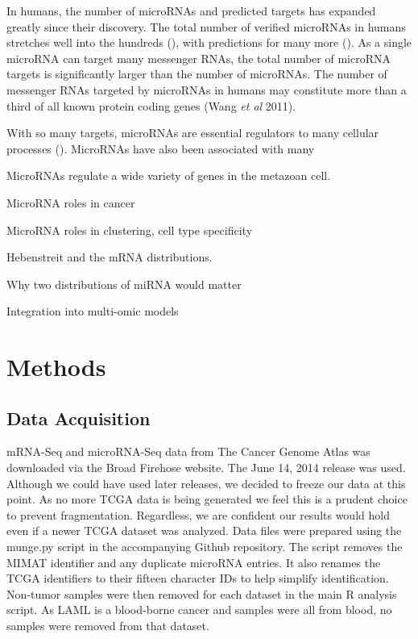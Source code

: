 \documentclass[12pt]{report}
\begin{document}
In humans, the number of microRNAs and predicted targets has expanded greatly since their discovery.
 The total number of verified microRNAs in humans  stretches well into the 
 hundreds (), with predictions for many more (). As a single microRNA can target 
 many messenger RNAs, the total number of microRNA targets is significantly 
 larger than the number of microRNAs. The number of messenger RNAs targeted by 
 microRNAs in humans may constitute more than a third of all known protein coding genes (Wang \emph{et al} 2011).
 
 
With so many targets, microRNAs are essential regulators to many cellular processes (). MicroRNAs have also
been associated with many  

MicroRNAs regulate a wide variety of genes in the metazoan cell. 

MicroRNA roles in cancer

MicroRNA roles in clustering, cell type specificity

Hebenstreit and the mRNA distributions.

Why two distributions of miRNA would matter

Integration into multi-omic models

\section*{Methods}
\subsection*{Data Acquisition}
mRNA-Seq and microRNA-Seq data from The Cancer Genome Atlas was downloaded via the Broad Firehose website.
The June 14, 2014 release was used. Although we could have used later releases, we decided to freeze our data at this point. As no more
TCGA data is being generated we feel this is a prudent choice to prevent fragmentation. Regardless, we are confident our results would hold
even if a newer TCGA dataset was analyzed. Data files were prepared using the munge.py script in the accompanying Github repository. The script
removes the MIMAT identifier and any duplicate microRNA entries. It also renames the TCGA identifiers to their fifteen character IDs to help
simplify identification. Non-tumor samples were then removed for each dataset in the main R analysis script. As LAML is a blood-borne cancer and samples were all from blood,
no samples were removed from that dataset.
\end{document}
